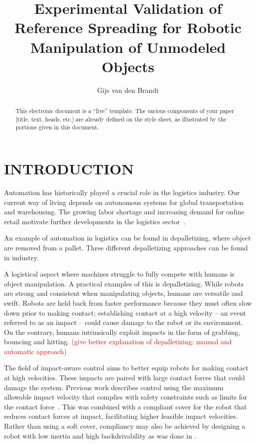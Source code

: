 \documentclass[a4paper, 10pt, conference]{ieeeconf}
\title{\LARGE \bf
    Experimental Validation of Reference Spreading for Robotic Manipulation of Unmodeled Objects
    }
\author{Gijs van den Brandt%
    }
\begin{document}
    \maketitle
    \thispagestyle{empty}
    \pagestyle{empty}

    \begin{abstract}

    This electronic document is a ``live'' template. The various components of your paper [title, text, heads, etc.] are already defined on the style sheet, as illustrated by the portions given in this document.

    \end{abstract}

    \section{INTRODUCTION}

    Automation has historically played a crucial role in the logistics industry. Our current way of living depends on autonomous systems for global transportation and warehousing. The growing labor shortage and increasing demand for online retail motivate further developments in the logistics sector~\cite{dekhneAutomationLogisticsBig2019}.

    An example of automation in logistics can be found in depalletizing, where object are removed from a pallet. Three different depalletizing approaches can be found in industry. 

    A logistical aspect where machines struggle to fully compete with humans is object manipulation. A practical examples of this is depalletizing. While robots are strong and consistent when manipulating objects, humans are versatile and swift. Robots are held back from faster performance because they must often slow down prior to making contact; establishing contact at a high velocity -- an event referred to as an impact -- could cause damage to the robot or its environment. On the contrary, humans intrinsically exploit impacts in the form of grabbing, bouncing and hitting. \textcolor{red}{(give better explanation of depalletizing: manual and automatic approach)}

    The field of impact-aware control aims to better equip robots for making contact at high velocities. These impacts are paired with large contact forces that could damage the system. Previous work describes control using the maximum allowable impact velocity that complies with safety constraints such as limits for the contact force~\cite{dehioRobotSafeImpactsSoft2021, dehioDualArmBoxGrabbing2022}. This was combined with a compliant cover for the robot that reduces contact forces at impact, facilitating higher feasible impact velocities. Rather than using a soft cover, compliancy may also be achieved by designing a robot with low inertia and high backdrivability as was done in \cite{songDevelopmentLowInertiaHighStiffness2018}.
\end{document}
